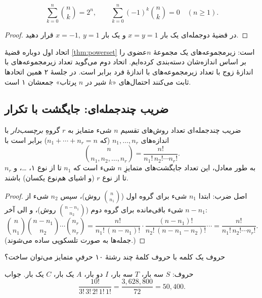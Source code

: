 \begin{corollary}[label=cor:binom-sums]{}
\[ \sum_{k=0}^n\binom nk=2^n, \qquad \sum_{k=0}^n(-1)^k\binom nk=0\quad(n\ge1). \]
\end{corollary}

\begin{proof}
در قضیهٔ دوجمله‌ای یک بار $x=y=1$ و یک بار $x=-1,\ y=1$ قرار دهید.
\end{proof}

\begin{intuition}
اتحاد اول دوباره قضیهٔ \ref{thm:powerset} است: زیرمجموعه‌های یک مجموعهٔ $n$عضوی را بر اساس اندازه‌شان دسته‌بندی کرده‌ایم. اتحاد دوم می‌گوید تعداد زیرمجموعه‌های با اندازهٔ زوج با تعداد زیرمجموعه‌های با اندازهٔ فرد برابر است. در جلسهٔ ۲ همین اتحادها ثابت می‌کنند احتمال‌های «$k$ شیر در $n$ پرتاب» جمعشان ۱ است.
\end{intuition}

\subsection{ضریب چندجمله‌ای: جایگشت با تکرار}

\begin{theorem}[label=thm:multinomial]{ضریب چندجمله‌ای}
تعداد روش‌های تقسیم $n$ شیء متمایز به $r$ گروهِ \emph{برچسب‌دار} با اندازه‌های $n_1,\dots,n_r$ (که $n_1+\cdots+n_r=n$) برابر است با
\[ \binom{n}{n_1,n_2,\dots,n_r}=\frac{n!}{n_1!\,n_2!\cdots n_r!}. \]
به طور معادل، این تعداد جایگشت‌های متمایزِ $n$ شیء است که $n_1$ تا از نوع ۱، \dots، و $n_r$ تا از نوع $r$ (و اشیای هم‌نوع یکسان) باشند.
\end{theorem}

\begin{proof}
اصل ضرب: ابتدا $n_1$ شیء برای گروه اول ($\binom{n}{n_1}$ روش)، سپس $n_2$ شیء از $n-n_1$ شیء باقی‌مانده برای گروه دوم ($\binom{n-n_1}{n_2}$ روش)، و الی آخر:
\[
\binom{n}{n_1}\binom{n-n_1}{n_2}\cdots\binom{n_r}{n_r}
=\frac{n!}{n_1!\,(n-n_1)!}\cdot\frac{(n-n_1)!}{n_2!\,(n-n_1-n_2)!}\cdots
=\frac{n!}{n_1!\,n_2!\cdots n_r!}.
\]
(جمله‌ها به صورت تلسکوپی ساده می‌شوند.)
\end{proof}

\begin{example}{حروف یک کلمه}
با حروف کلمهٔ  چند رشتهٔ ۱۰ حرفیِ متمایز می‌توان ساخت؟
\begin{solution}
حروف: $S$ سه بار، $T$ سه بار، $I$ دو بار، $A$ یک بار، $C$ یک بار. جواب
\[ \frac{10!}{3!\,3!\,2!\,1!\,1!}=\frac{3{,}628{,}800}{72}=50{,}400. \]
\end{solution}
\end{example}

